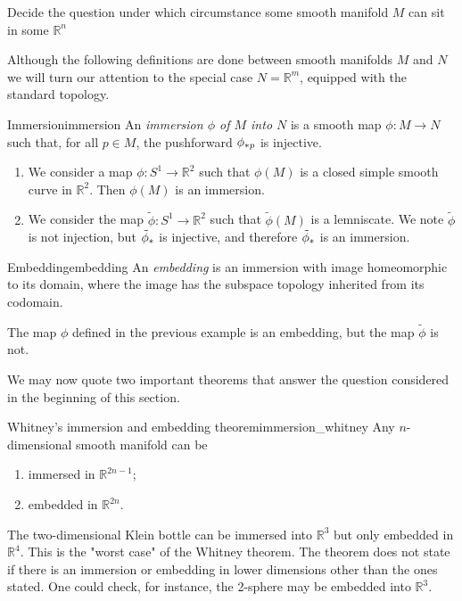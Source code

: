Decide the question under which circumstance some smooth manifold \(M\) can sit in some \(\mathbb{R}^n\)

Although the following definitions are done between smooth manifolds \(M\) and \(N\) we will turn our attention to the special case \(N=\mathbb{R}^m\), equipped with the standard topology.

\begin{definition}{Immersion}{immersion}
    An \emph{immersion \(\phi\) of \(M\) into \(N\)} is a smooth map \(\phi : M \to N\) such that, for all \(p \in M\), the pushforward \(\pf[p]\phi\) is injective.
\end{definition}
\begin{example}
    \begin{enumerate}[label=(\alph*)]
        \item We consider a map \(\phi : S^1 \to \mathbb{R}^2\) such that \(\phi(M)\) is a closed simple smooth curve in \(\mathbb{R}^2\). Then \(\phi(M)\) is an immersion.
        \item We consider the map \(\tilde\phi : S^1 \to \mathbb{R}^2\) such that \(\tilde\phi(M)\) is a lemniscate. We note \(\tilde\phi\) is not injection, but \(\pf{\tilde\phi}\) is injective, and therefore \(\pf{\tilde\phi}\) is an immersion.
    \end{enumerate}
\end{example}

\begin{definition}{Embedding}{embedding}
    An \emph{embedding} is an immersion with image homeomorphic to its domain, where the image has the subspace topology inherited from its codomain.
\end{definition}
\begin{example}
    The map \(\phi\) defined in the previous example is an embedding, but the map \(\tilde\phi\) is not.
\end{example}

We may now quote two important theorems that answer the question considered in the beginning of this section.

\begin{theorem}{Whitney's immersion and embedding theorem}{immersion_whitney}
    Any \(n\)-dimensional smooth manifold can be
    \begin{enumerate}[label=(\alph*)]
        \item immersed in \(\mathbb{R}^{2n-1}\);
        \item embedded in \(\mathbb{R}^{2n}\).
    \end{enumerate}
\end{theorem}
\begin{example}
    The two-dimensional Klein bottle can be immersed into \(\mathbb{R}^3\) but only embedded in \(\mathbb{R}^4\). This is the "worst case" of the Whitney theorem. The theorem does not state if there is an immersion or embedding in lower dimensions other than the ones stated. One could check, for instance, the 2-sphere may be embedded into \(\mathbb{R}^3\).
\end{example}

